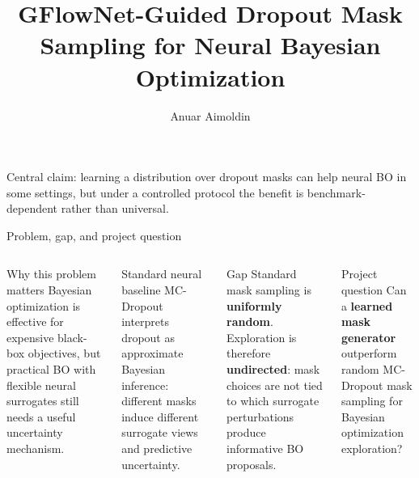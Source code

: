 \documentclass[aspectratio=169]{beamer}
\title[GFlowNet-BO]{GFlowNet-Guided Dropout Mask Sampling for Neural Bayesian Optimization}
\author{Anuar Aimoldin}
\institute{Course Project Presentation\\[-0.2em]\TinyCap Learned dropout-mask generation for neural Bayesian optimization under a controlled evaluation protocol}
\date{}
\newcommand{\TinyCap}{\fontsize{8.0}{9}\selectfont}
\begin{document}
\begin{frame}
  \titlepage
  \vspace{-0.7em}
  \begin{center}
    {\TinyCap Central claim: learning a distribution over dropout masks can help neural BO in some settings, but under a controlled protocol the benefit is benchmark-dependent rather than universal.}
  \end{center}
\end{frame}

\begin{frame}{Problem, gap, and project question}
\vspace{-0.55em}
\begin{columns}[T,onlytextwidth]
\begin{minipage}[t][0.82\textheight]{\linewidth}\vspace{0pt}
  \begin{cardA}{Why this problem matters}
  Bayesian optimization is effective for expensive black-box objectives, but practical BO with flexible neural surrogates still needs a useful uncertainty mechanism.
  \end{cardA}

  \vfill

  \begin{card}{Standard neural baseline}
  MC-Dropout interprets dropout as approximate Bayesian inference: different masks induce different surrogate views and predictive uncertainty.
  \end{card}

  \vfill

  \begin{cardW}{Gap}
  Standard mask sampling is \textbf{uniformly random}. Exploration is therefore \textbf{undirected}: mask choices are not tied to which surrogate perturbations produce informative BO proposals.
  \end{cardW}
\end{minipage}

\begin{minipage}[t][0.82\textheight]{\linewidth}\vspace{0pt}
  \begin{cardG}{Project question}
  Can a \textbf{learned mask generator} outperform random MC-Dropout mask sampling for Bayesian optimization exploration?
  \end{cardG}


\end{minipage}
\end{columns}
\end{frame}
\end{document}
